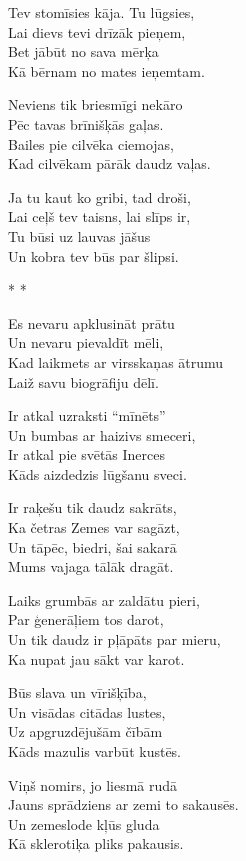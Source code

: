 \documentclass[14pt]{extarticle}
\begin{document}
Tev stomīsies kāja. Tu lūgsies,\\
Lai dievs tevi drīzāk pieņem,\\
Bet jābūt no sava mērķa\\
Kā bērnam no mates ieņemtam.

Neviens tik briesmīgi nekāro\\
Pēc tavas brīnišķās gaļas.\\
Bailes pie cilvēka ciemojas,\\
Kad cilvēkam pārāk daudz vaļas.

Ja tu kaut ko gribi, tad droši,\\
Lai ceļš tev taisns, lai slīps ir,\\
Tu būsi uz lauvas jāšus\\
Un kobra tev būs par šlipsi.


\newpage

{\large \sc * * *}

Es nevaru apklusināt prātu\\
Un nevaru pievaldīt mēli,\\
Kad laikmets ar virsskaņas ātrumu\\
Laiž savu biogrāfiju dēlī.

Ir atkal uzraksti ``mīnēts''\\
Un bumbas ar haizivs smeceri,\\
Ir atkal pie svētās Inerces\\
Kāds aizdedzis lūgšanu sveci.

Ir raķešu tik daudz sakrāts,\\
Ka četras Zemes var sagāzt,\\
Un tāpēc, biedri, šai sakarā\\
Mums vajaga tālāk dragāt.

Laiks grumbās ar zaldātu pieri,\\
Par ģenerāļiem tos darot,\\
Un tik daudz ir pļāpāts par mieru,\\
Ka nupat jau sākt var karot.

Būs slava un vīrišķība,\\
Un visādas citādas lustes,\\
Uz apgruzdējušām čībām\\
Kāds mazulis varbūt kustēs.

Viņš nomirs, jo liesmā rudā\\
Jauns sprādziens ar zemi to sakausēs.\\
Un zemeslode kļūs gluda\\
Kā sklerotiķa pliks pakausis.
\end{document}
